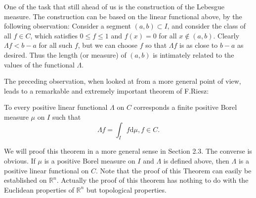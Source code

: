 One of the task that still ahead of us is the construction of the Lebesgue measure. The construction can be based on the linear functional above, by the following observation: Consider a segment $(a,b)\subset I$, and consider the class of all $f\in C$, which satisfies $0\le f\le 1$ and $f(x)=0$ for all $x\notin(a,b)$. Clearly $\Lambda f<b-a$ for all such $f$, but we can choose $f$ so that $\Lambda f$ is as close to $b-a$ as desired. Thus the length (or measure) of $(a,b)$ is intimately related to the values of the functional $\Lambda$.\par
The preceding observation, when looked at from a more general point of view, leads to a remarkable and extremely important theorem of F.Riesz:
\begin{theorem}
To every positive linear functional $\Lambda$ on $C$ corresponds a finite positive Borel measure $\mu$ on $I$ such that 
$$\Lambda f=\int_If\mathrm{d}\mu,f\in C.$$
\end{theorem}
We will proof this theorem in a more general sense in Section 2.3. The converse is obvious. If $\mu$ is a positive Borel measure on $I$ and $\Lambda$ is defined above, then $\Lambda$ is a positive linear functional on $C$. Note that the proof of this Theorem can easily be established on $\mathbb{R}^n$. Actually the proof of this theorem has nothing to do with the Euclidean properties of $\mathbb{R}^n$ but topological properties.
